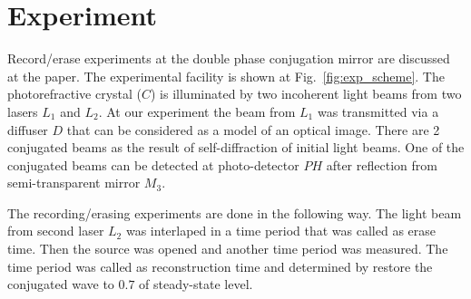 \section{Experiment}
Record/erase experiments at the double phase conjugation mirror
are discussed at the paper.  
The experimental facility is shown at Fig.~\ref{fig:exp_scheme}. The
photorefractive crystal ($C$) is illuminated by two incoherent light
beams from two lasers $L_1$ and $L_2$. At our experiment the beam from
$L_1$ was transmitted via a diffuser $D$ that can be considered as a
model of an optical image. There are 2 conjugated beams as the result
of self-diffraction of initial light beams. One of the conjugated beams
can be detected at photo-detector $PH$ after reflection from
semi-transparent mirror $M_3$.



The recording/erasing experiments are done in the following way. The
light beam from second laser $L_2$  was interlaped in a time period
that was called as erase time. Then the source was opened and another
time period was measured. The time period was called as
reconstruction time and determined by restore the conjugated wave to
$0.7$ of steady-state level.
